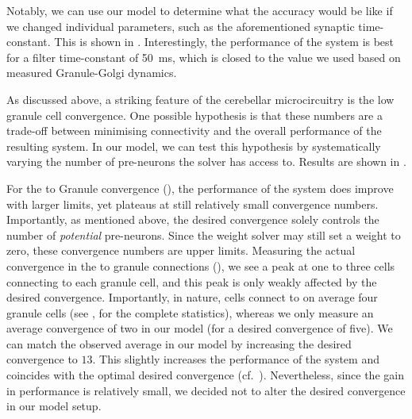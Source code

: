 Notably, we can use our model to determine what the accuracy would be like if we changed individual parameters, such as the aforementioned synaptic time-constant.
This is shown in .
Interestingly, the performance of the system is best for a filter time-constant of \SI{50}{\milli\second}, which is closed to the value we used based on measured Granule-Golgi dynamics.

As discussed above, a striking feature of the cerebellar microcircuitry is the low granule cell convergence. One possible hypothesis is that these numbers are a trade-off between minimising connectivity and the overall performance of the resulting system.
In our model, we can test this hypothesis by systematically varying the number of pre-neurons the solver has access to. Results are shown in .

For the \PCN to Granule convergence (), the performance of the system does improve with larger limits, yet plateaus at still relatively small convergence numbers.
Importantly, as mentioned above, the desired convergence solely controls the number of \emph{potential} pre-neurons.
Since the weight solver may still set a weight to zero, these convergence numbers are upper limits.
Measuring the actual convergence in the \PCN to granule connections (), we see a peak at one to three \PCN cells connecting to each granule cell, and this peak is only weakly affected by the desired convergence.
Importantly, in nature, \PCN cells connect to on average four granule cells (see \cite{palkovits1972quantitative}, for the complete statistics), whereas we only measure an average convergence of two in our model (for a desired convergence of five).
We can match the observed average in our model by increasing the desired convergence to $13$.
This slightly increases the performance of the system and coincides with the optimal desired convergence (cf.~).
Nevertheless, since the gain in performance is relatively small, we decided not to alter the desired convergence in our model setup.

